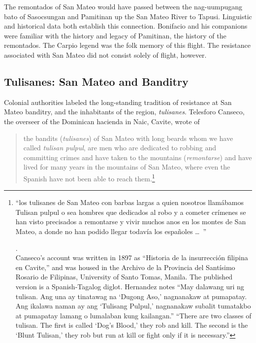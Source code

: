 The remontados of San Mateo would have passed between the nag-uumpugang bato of Sasocsungan and Pamitinan up the San Mateo River to Tapusi. Linguistic and historical data both establish this connection. Bonifacio and his companions were familiar with the history and legacy of Pamitinan, the history of the remontados. The Carpio legend was the folk memory of this flight. The resistance associated with San Mateo did not consist solely of flight, however.

\subsection{Tulisanes: San Mateo and Banditry}

Colonial authorities labeled the long-standing tradition of resistance at San Mateo banditry, and the inhabitants of the region, \textit{tulisanes}. Telesforo Canseco, the overseer of the Dominican hacienda in Naic, Cavite, wrote of

\begin{quote}
the bandits (\textit{tulisanes}) of San Mateo with long beards whom we have called \textit{tulisan pulpul}, are men who are dedicated to robbing and committing crimes and have taken to the mountains (\textit{remontarse}) and have lived for many years in the mountains of San Mateo, where even the Spanish have not been able to reach them.\footnote{\begin{otherlanguage}{spanish}\enquote{los tulisanes de San Mateo con barbas largas a quien nosotros llam\'abamos Tulisan pulpul o sea hombres que dedicados al robo y a cometer crímenes se han visto precisados a remontarse y vivir muchos anos  en los montes de San Mateo, a donde no han podido llegar todav\'ia los espa\~noles \ldots\ }\end{otherlanguage} \parencite[64]{Canseco1999}.\\
Canseco's account was written in 1897 as \enquote{Historia de la insurrecci\'on  filipina en Cavite,} and was housed in the Archivo de la Provincia del Sant\'isimo Rosario de Filipinas, University of Santo Tomas, Manila. The published version is a Spanish-Tagalog diglot. Hernandez notes \enquote{May dalawang uri ng tulisan. Ang una ay tinatawag na \enquote{Dugong Aso,} nagnanakaw at pumapatay. Ang ikalawa naman ay ang \enquote{Tulisang Pulpul,} nagnanakaw subalit tumatakbo at pumapatay lamang o lumalaban kung kailangan.} \cite[69, fn. 7]{Canseco1999} \enquote{There are two classes of tulisan. The first is called \enquote{Dog’s Blood,} they rob and kill. The second is the \enquote{Blunt Tulisan,} they rob but run at kill or fight only if it is necessary.}}
\end{quote}

